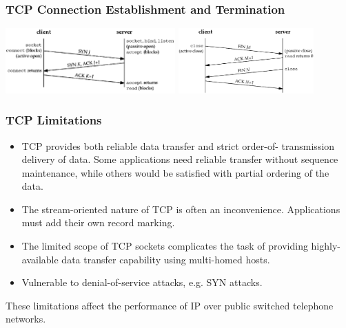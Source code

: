\documentclass[notes,serif]{beamer}
\begin{document}
\begin{frame}
  \frametitle{TCP Connection Establishment and Termination}

  \includegraphics[height=2.5cm]{figs/02fig02.png}
  \includegraphics[height=2.5cm]{figs/02fig03.png}
\end{frame}

\begin{frame}
  \frametitle{TCP Limitations}
  \begin{itemize}
    \item TCP provides both reliable data transfer and strict order-of- transmission
    delivery of data. Some applications need reliable transfer without sequence maintenance,
    while others would be satisfied with partial ordering of the data.
    \item The stream-oriented nature of TCP is often an inconvenience.
    Applications must add their own record marking.
    \item The limited scope of TCP sockets complicates the task of providing highly-available data transfer capability using multi-homed hosts.
    \item Vulnerable to denial-of-service attacks, e.g. SYN attacks.
  \end{itemize}
  These limitations affect the performance of IP over public switched telephone networks.
\end{frame}
\end{document}
